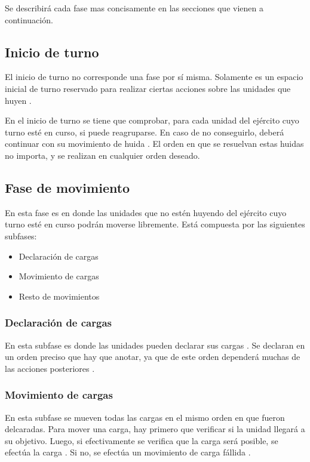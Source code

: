Se describirá cada fase mas concisamente en las secciones que vienen a
continuación.

\subsection*{Inicio de turno}
\label{inicioturno}
El inicio de turno no corresponde una fase por sí misma. Solamente es
un espacio inicial de turno reservado para realizar ciertas acciones
sobre las unidades que huyen .

En el inicio de turno se tiene que comprobar, para cada unidad del
ejército cuyo turno esté en curso, si puede reagruparse. En caso de no
conseguirlo, deberá continuar con su movimiento de huida . El orden en
que se resuelvan estas huidas no importa, y se realizan en cualquier
orden deseado.

\subsection*{Fase de movimiento}
\label{fasemovimiento}
En esta fase es en donde las unidades que no estén huyendo del
ejército cuyo turno esté en curso podrán moverse libremente. Está
compuesta por las siguientes subfases:

\begin{itemize}
\item Declaración de cargas
\item Movimiento de cargas
\item Resto de movimientos
\end{itemize}

\subsubsection*{Declaración de cargas}
En esta subfase es donde las unidades pueden declarar sus cargas . Se
declaran en un orden preciso que hay que anotar, ya que de este orden
dependerá muchas de las acciones posteriores .

\subsubsection*{Movimiento de cargas}
En esta subfase se mueven todas las cargas en el mismo orden en que
fueron delcaradas. Para mover una carga, hay primero que verificar si
la unidad llegará a su objetivo. Luego, si efectivamente se verifica
que la carga será posible, se efectúa la carga . Si no, se efectúa un
movimiento de carga fállida .

